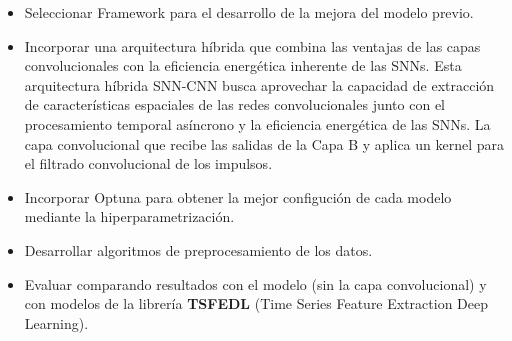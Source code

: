 \begin{itemize}
    \item Seleccionar Framework para el desarrollo de la mejora del modelo previo.
    \item Incorporar una arquitectura híbrida que combina las ventajas de las capas convolucionales con la eficiencia energética inherente de las SNNs. Esta arquitectura híbrida SNN-CNN busca aprovechar la capacidad de extracción de características espaciales de las redes convolucionales junto con el procesamiento temporal asíncrono y la eficiencia energética de las SNNs. La capa convolucional que recibe las salidas de la Capa B y aplica un kernel para el filtrado convolucional de los impulsos.
    \item Incorporar Optuna para obtener la mejor configución de cada modelo mediante la hiperparametrización.
    \item Desarrollar algoritmos de preprocesamiento de los datos.
    \item Evaluar comparando resultados con el modelo (sin la capa convolucional) y con modelos de la librería \textbf{TSFEDL} (Time Series Feature Extraction Deep Learning).

\end{itemize}


